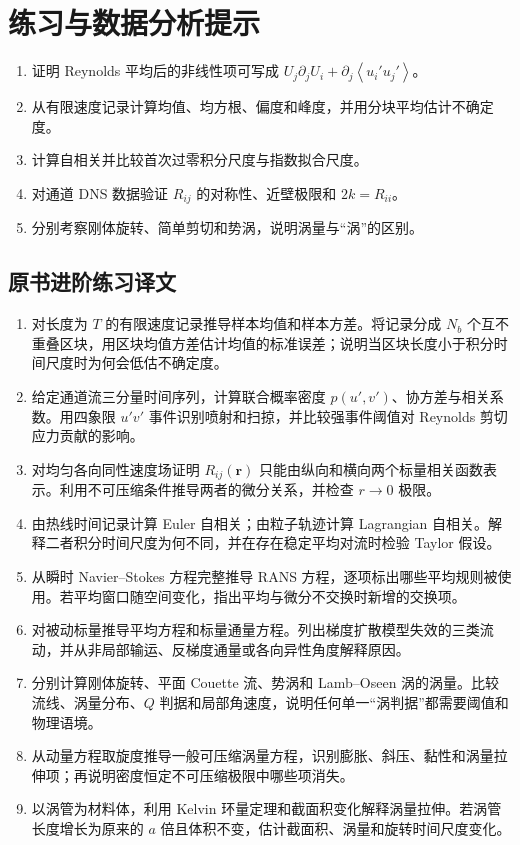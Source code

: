 \documentclass[12pt,a4paper,openany,fontset=none]{ctexbook}
\newcommand{\avg}[1]{\left\langle #1\right\rangle}
\begin{document}
\section*{练习与数据分析提示}
\begin{enumerate}
 \item 证明 Reynolds 平均后的非线性项可写成 $U_j\partial_jU_i+\partial_j\avg{u_i'u_j'}$。
 \item 从有限速度记录计算均值、均方根、偏度和峰度，并用分块平均估计不确定度。
 \item 计算自相关并比较首次过零积分尺度与指数拟合尺度。
 \item 对通道 DNS 数据验证 $R_{ij}$ 的对称性、近壁极限和 $2k=R_{ii}$。
 \item 分别考察刚体旋转、简单剪切和势涡，说明涡量与“涡”的区别。
\end{enumerate}

\subsection*{原书进阶练习译文}
\begin{enumerate}[label=\arabic*.]
 \item 对长度为 $T$ 的有限速度记录推导样本均值和样本方差。将记录分成 $N_b$ 个互不重叠区块，用区块均值方差估计均值的标准误差；说明当区块长度小于积分时间尺度时为何会低估不确定度。
 \item 给定通道流三分量时间序列，计算联合概率密度 $p(u',v')$、协方差与相关系数。用四象限 $u'v'$ 事件识别喷射和扫掠，并比较强事件阈值对 Reynolds 剪切应力贡献的影响。
 \item 对均匀各向同性速度场证明 $R_{ij}(\bm r)$ 只能由纵向和横向两个标量相关函数表示。利用不可压缩条件推导两者的微分关系，并检查 $r\to0$ 极限。
 \item 由热线时间记录计算 Euler 自相关；由粒子轨迹计算 Lagrangian 自相关。解释二者积分时间尺度为何不同，并在存在稳定平均对流时检验 Taylor 假设。
 \item 从瞬时 Navier--Stokes 方程完整推导 RANS 方程，逐项标出哪些平均规则被使用。若平均窗口随空间变化，指出平均与微分不交换时新增的交换项。
 \item 对被动标量推导平均方程和标量通量方程。列出梯度扩散模型失效的三类流动，并从非局部输运、反梯度通量或各向异性角度解释原因。
 \item 分别计算刚体旋转、平面 Couette 流、势涡和 Lamb--Oseen 涡的涡量。比较流线、涡量分布、$Q$ 判据和局部角速度，说明任何单一“涡判据”都需要阈值和物理语境。
 \item 从动量方程取旋度推导一般可压缩涡量方程，识别膨胀、斜压、黏性和涡量拉伸项；再说明密度恒定不可压缩极限中哪些项消失。
 \item 以涡管为材料体，利用 Kelvin 环量定理和截面积变化解释涡量拉伸。若涡管长度增长为原来的 $a$ 倍且体积不变，估计截面积、涡量和旋转时间尺度变化。
\end{enumerate}
\end{document}
